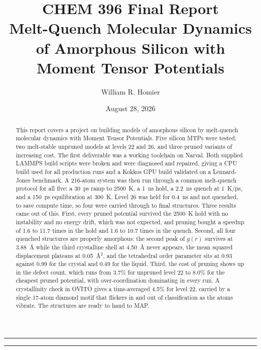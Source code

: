 \documentclass[11pt]{article}
\begin{document}
\title{CHEM 396 Final Report\\[0.3em]
\large Melt-Quench Molecular Dynamics of Amorphous Silicon with Moment Tensor Potentials}
\author{William R. Homier}
\date{August 28, 2026}
\setcounter{Maxaffil}{0}
\renewcommand\Affilfont{\itshape\small}
\maketitle
\thispagestyle{empty}

\noindent\rule{\textwidth}{0.4pt}
\begin{abstract}
    \noindent This report covers a project on building models of amorphous silicon by melt-quench molecular dynamics with Moment Tensor Potentials. Five silicon MTPs were tested: two melt-stable unpruned models at levels 22 and 26, and three pruned variants of increasing cost. The first deliverable was a working toolchain on Narval. Both supplied LAMMPS build scripts were broken and were diagnosed and repaired, giving a CPU build used for all production runs and a Kokkos GPU build validated on a Lennard-Jones benchmark. A 216-atom system was then run through a common melt-quench protocol for all five: a 30~ps ramp to 2500~K, a 1~ns hold, a 2.2~ns quench at 1~K/ps, and a 150~ps equilibration at 300~K. Level 26 was held for 0.4~ns and not quenched, to save compute time, so four were carried through to final structures. Three results came out of this. First, every pruned potential survived the 2500~K hold with no instability and no energy drift, which was not expected, and pruning bought a speedup of 1.6 to 11.7 times in the hold and 1.6 to 10.7 times in the quench. Second, all four quenched structures are properly amorphous: the second peak of $g(r)$ survives at 3.88~\AA{} while the third crystalline shell at 4.50~\AA{} never appears, the mean squared displacement plateaus at 0.05~\AA$^2$, and the tetrahedral order parameter sits at 0.93 against 0.99 for the crystal and 0.49 for the liquid. Third, the cost of pruning shows up in the defect count, which runs from 3.7\% for unpruned level 22 to 8.0\% for the cheapest pruned potential, with over-coordination dominating in every run. A crystallinity check in OVITO gives a time-averaged 4.5\% for level 22, carried by a single 17-atom diamond motif that flickers in and out of classification as the atoms vibrate. The structures are ready to hand to MAP.
\end{abstract}
\noindent\rule{\textwidth}{0.4pt}
\clearpage
\end{document}

